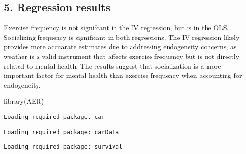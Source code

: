 \documentclass[
  letterpaper,
  DIV=11,
  numbers=noendperiod]{scrartcl}
\newenvironment{Shaded}{\begin{snugshade}}{\end{snugshade}}
\newcommand{\FunctionTok}[1]{\textcolor[rgb]{0.28,0.35,0.67}{#1}}
\newcommand{\NormalTok}[1]{\textcolor[rgb]{0.00,0.23,0.31}{#1}}
\begin{document}
\subsection{5. Regression results}\label{regression-results-1}

Exercise frequency is not signifcant in the IV regression, but is in the
OLS. Socializing frequency is significant in both regressions. The IV
regression likely provides more accuarate estimates due to addressing
endogeneity concerns, as weather is a valid instrument that affects
exercise frequency but is not directly related to mental health. The
results suggest that socialization is a more important factor for mental
health than exercise frequency when accounting for endogeneity.

\begin{Shaded}
\begin{Highlighting}[]
\FunctionTok{library}\NormalTok{(AER)}
\end{Highlighting}
\end{Shaded}

\begin{verbatim}
Loading required package: car
\end{verbatim}

\begin{verbatim}
Loading required package: carData
\end{verbatim}

\begin{verbatim}
Loading required package: survival
\end{verbatim}
\end{document}
